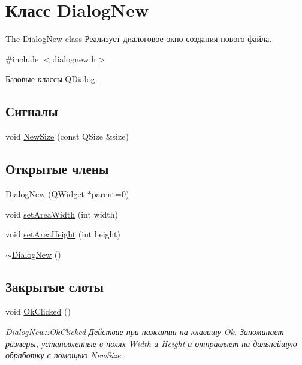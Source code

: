 \hypertarget{class_dialog_new}{\section{Класс Dialog\+New}
\label{class_dialog_new}
}


The \hyperlink{class_dialog_new}{Dialog\+New} class Реализует диалоговое окно создания нового файла.  




{\ttfamily \#include $<$dialognew.\+h$>$}



Базовые классы\+:Q\+Dialog.

\subsection*{Сигналы}
\begin{DoxyCompactItemize}
\item 
void \hyperlink{class_dialog_new_adfb75c668c8154bb0c6d6edf8a66c1f8}{New\+Size} (const Q\+Size \&size)
\end{DoxyCompactItemize}
\subsection*{Открытые члены}
\begin{DoxyCompactItemize}
\item 
\hyperlink{class_dialog_new_ad63213cf645ff901bbe69f9da2995fe1}{Dialog\+New} (Q\+Widget $\ast$parent=0)
\item 
void \hyperlink{class_dialog_new_a9ca0f71f5f8d9ff7565ea2469b4bf0ce}{set\+Area\+Width} (int width)
\item 
void \hyperlink{class_dialog_new_a7cadcb96bde6eefb2d4391da013b2d99}{set\+Area\+Height} (int height)
\item 
\hyperlink{class_dialog_new_a29f6cb77959df0200fbf4f6d7d2e154d}{$\sim$\+Dialog\+New} ()
\end{DoxyCompactItemize}
\subsection*{Закрытые слоты}
\begin{DoxyCompactItemize}
\item 
void \hyperlink{class_dialog_new_a9466ba40cff2d02221d90cf585bcb8ae}{Ok\+Clicked} ()
\begin{DoxyCompactList}\small\item\em \hyperlink{class_dialog_new_a9466ba40cff2d02221d90cf585bcb8ae}{Dialog\+New\+::\+Ok\+Clicked} Действие при нажатии на клавишу Ok. Запоминает размеры, установленные в полях Width и Height и отправляет на дальнейшую обработку с помощью New\+Size. \end{DoxyCompactList}\end{DoxyCompactItemize}
